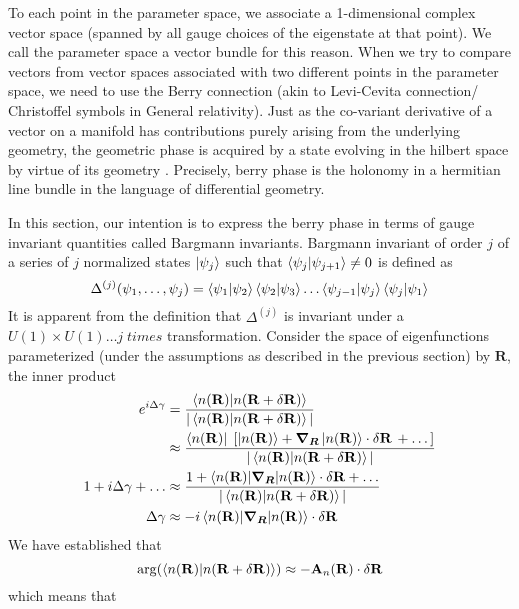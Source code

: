 To each point in the parameter space, we associate a 1-dimensional complex vector space (spanned by all gauge choices of the eigenstate at that point). We call the parameter space a vector bundle for this reason.
When we try to compare vectors from vector spaces associated with two different points in the parameter space, we need to use the Berry connection (akin to Levi-Cevita connection/
Christoffel symbols in General relativity). Just as the co-variant derivative of a vector on a manifold has contributions purely arising from the underlying 
geometry, the geometric phase is acquired by a state evolving in the hilbert space by virtue of its geometry \cite{simon1983holonomy}. 
Precisely, berry phase is the holonomy in a hermitian line bundle in the language of differential geometry.

In this section, our intention is to express the berry phase in terms of gauge invariant quantities called Bargmann invariants. 
Bargmann invariant of order $j$ of a series of $j$ normalized states $\ket{\psi_j}$ such that $\braket{\psi_j|\psi_{j+1}} \neq 0$ is defined as 
\begin{equation}
 \Delta^{(j)}(\psi_1, \dots, \psi_j) = \braket{\psi_1 | \psi_2}\braket{\psi_2|\psi_3}\dots\braket{\psi_{j-1}|\psi_j}\braket{\psi_j|\psi_1}
\end{equation} It is apparent from the definition that $\Delta^{(j)}$ is invariant under a $U(1) \times U(1) \dots j\;times$ transformation.
Consider the space of eigenfunctions parameterized (under the assumptions as 
described in the previous section) by $\mathbf{R}$, the inner product 
\begin{align}
e^{i\Delta\gamma} &= \frac{\braket{n(\mathbf{R})|n(\mathbf{R} +\delta\mathbf{R})}}{|\braket{n(\mathbf{R})|n(\mathbf{R} +\delta\mathbf{R})}|} \\
 		  &\approx \frac{\bra{n(\mathbf{R})}\;\lbrack \ket{n(\mathbf{R})} + \bm{\nabla_R}\ket{n(\mathbf{R})}\cdot \delta\mathbf{R}\, + \dots \rbrack}{|\braket{n(\mathbf{R})|n(\mathbf{R} +\delta\mathbf{R})}|} \nonumber \\
1 + i\Delta\gamma + \dots &\approx \frac{1 + \braket{n(\mathbf{R})|\bm{\nabla_R}|n(\mathbf{R})}\cdot \delta\mathbf{R} + \dots}{|\braket{n(\mathbf{R})|n(\mathbf{R} +\delta\mathbf{R})}|} \nonumber \\
\Delta\gamma	   &\approx  -i\braket{n(\mathbf{R})|\bm{\nabla_R}|n(\mathbf{R})}\cdot \delta\mathbf{R}
\end{align}
We have established that 
\begin{equation*}
 \arg(\braket{n(\mathbf{R})|n(\mathbf{R} +\delta\mathbf{R})}) \approx -\mathbf{A}_{n}(\mathbf{R}) \cdot \delta\mathbf{R}
\end{equation*} which means that
